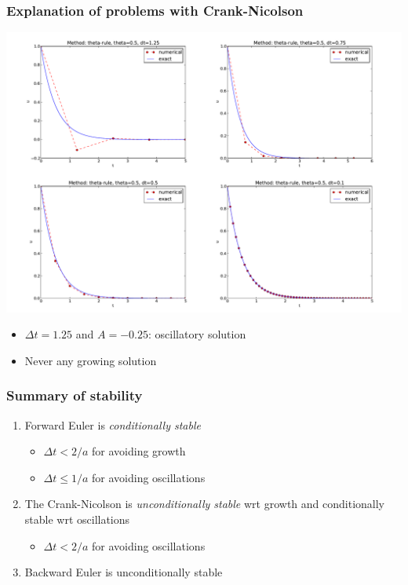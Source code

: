 \documentclass{beamer}
\begin{document}
\begin{frame}
\frametitle{Explanation of problems with Crank-Nicolson}

\centerline{\includegraphics[width=1.1\linewidth]{fig-analysis/CN4c.pdf}}



\begin{itemize}
 \item $\Delta t=1.25$ and $A=-0.25$: oscillatory solution

 \item Never any growing solution
\end{itemize}

\noindent
\end{frame}

\begin{frame}
\frametitle{Summary of stability}

\begin{enumerate}
\item Forward Euler is \emph{conditionally stable}
\begin{itemize}

   \item $\Delta t < 2/a$ for avoiding growth

   \item $\Delta t\leq 1/a$ for avoiding oscillations

\end{itemize}

\noindent
\item The Crank-Nicolson is \emph{unconditionally stable} wrt growth
   and conditionally stable wrt oscillations
\begin{itemize}

   \item $\Delta t < 2/a$ for avoiding oscillations

\end{itemize}

\noindent
\item Backward Euler is unconditionally stable
\end{enumerate}

\noindent
\end{frame}
\end{document}
